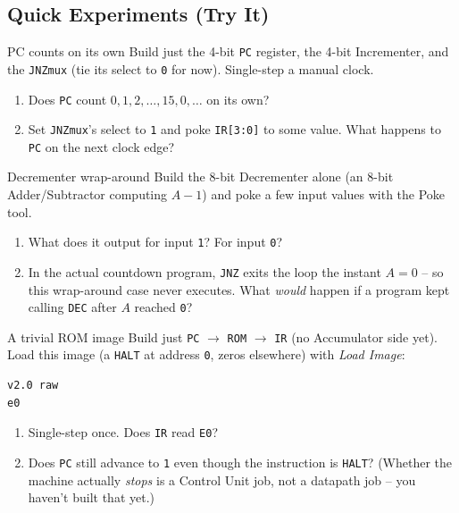 \documentclass[11pt]{article}
\begin{document}
\subsection*{Quick Experiments (Try It)}

\begin{tryit}{PC counts on its own}
Build just the 4-bit \texttt{PC} register, the 4-bit Incrementer, and the
\texttt{JNZmux} (tie its select to \texttt{0} for now). Single-step a manual clock.
\begin{enumerate}[nosep,leftmargin=*]
  \item Does \texttt{PC} count $0,1,2,\ldots,15,0,\ldots$ on its own?
  \item Set \texttt{JNZmux}'s select to \texttt{1} and poke \texttt{IR[3:0]} to some
        value. What happens to \texttt{PC} on the next clock edge?
\end{enumerate}
\end{tryit}

\begin{tryit}{Decrementer wrap-around}
Build the 8-bit Decrementer alone (an 8-bit Adder/Subtractor computing $A-1$) and
poke a few input values with the Poke tool.
\begin{enumerate}[nosep,leftmargin=*]
  \item What does it output for input \texttt{1}? For input \texttt{0}?
  \item In the actual countdown program, \texttt{JNZ} exits the loop the instant
        $A=0$ -- so this wrap-around case never executes. What \emph{would} happen
        if a program kept calling \texttt{DEC} after $A$ reached \texttt{0}?
\end{enumerate}
\end{tryit}

\begin{tryit}{A trivial ROM image}
Build just \texttt{PC} $\to$ \texttt{ROM} $\to$ \texttt{IR} (no Accumulator side
yet). Load this image (a \texttt{HALT} at address \texttt{0}, zeros elsewhere)
with \emph{Load Image}:
\begin{lstlisting}
v2.0 raw
e0
\end{lstlisting}
\begin{enumerate}[nosep,leftmargin=*]
  \item Single-step once. Does \texttt{IR} read \texttt{E0}?
  \item Does \texttt{PC} still advance to \texttt{1} even though the instruction is
        \texttt{HALT}? (Whether the machine actually \emph{stops} is a Control Unit
        job, not a datapath job -- you haven't built that yet.)
\end{enumerate}
\end{tryit}
\end{document}
